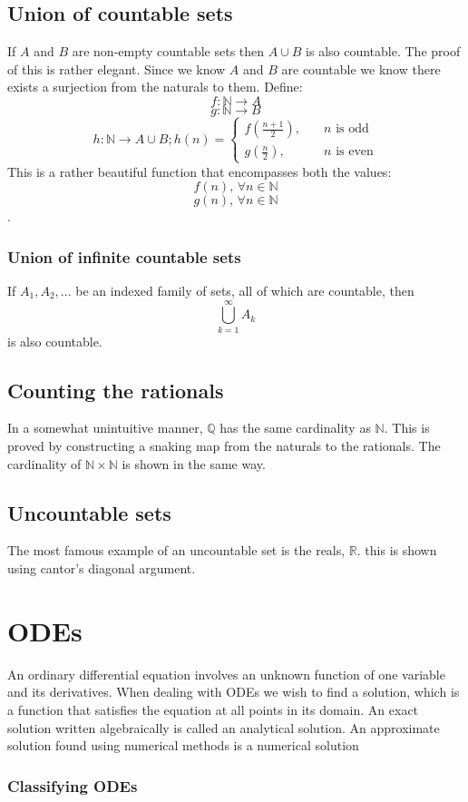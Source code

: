 \documentclass[12pt]{article}
\begin{document}
\subsection*{Union of countable sets}
If \(A\) and \(B\) are non-empty countable sets then \(A\cup B\) is also countable. The proof of this is rather elegant. Since we know \(A\) and \(B\) are countable we know there exists a surjection from the naturals to them. Define:
\[f:\mathbb{N}\to A\]
\[g:\mathbb{N}\to B\]
\[h:\mathbb{N}\to A\cup B;h(n)=\begin{cases}
f\left(\frac{n+1}{2}\right),\quad &n\text{ is odd} \\
g\left(\frac{n}{2}\right),\quad &n\text{ is even}
\end{cases}\]
This is a rather beautiful function that encompasses both the values:
\[f(n),\,\forall n\in\mathbb{N}\]
\[g(n),\,\forall n\in\mathbb{N}\].
\subsubsection*{Union of infinite countable sets}
If \(A_1,A_2,...\) be an indexed family of sets, all of which are countable, then
\[\bigcup_{k=1}^\infty A_k\]
is also countable.
\subsection*{Counting the rationals}
In a somewhat unintuitive manner, \(\mathbb{Q}\) has the same cardinality as \(\mathbb{N}\). This is proved by constructing a snaking map from the naturals to the rationals. The cardinality of \(\mathbb{N}\times\mathbb{N}\) is shown in the same way.
\subsection*{Uncountable sets}
The most famous example of an uncountable set is the reals, \(\mathbb{R}\). this is shown using cantor's diagonal argument.
\section{ODEs}
An ordinary differential equation involves an unknown function of one variable and its derivatives. When dealing with ODEs we wish to find a solution, which is a function that satisfies the equation at all points in its domain. An exact solution written algebraically is called an analytical solution. An approximate solution found using numerical methods is a numerical solution
\subsubsection*{Classifying ODEs}
\end{document}
